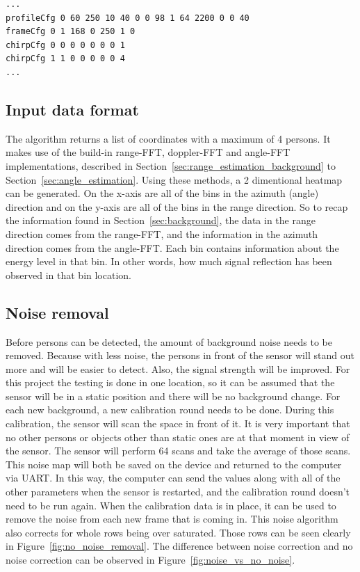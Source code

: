 \begin{lstlisting}[label=lst:parameters, caption=Portion of the parameters file which gets send to the IWR6843 to set it up.]
...
profileCfg 0 60 250 10 40 0 0 98 1 64 2200 0 0 40
frameCfg 0 1 168 0 250 1 0
chirpCfg 0 0 0 0 0 0 0 1
chirpCfg 1 1 0 0 0 0 0 4
...
\end{lstlisting}

\subsection{Input data format}
The algorithm returns a list of coordinates with a maximum of 4 persons. It makes use of the build-in range-FFT, doppler-FFT and angle-FFT implementations, described in Section~\ref{sec:range_estimation_background} to Section~\ref{sec:angle_estimation}. Using these methods, a 2 dimentional heatmap can be generated. On the x-axis are all of the bins in the azimuth (angle) direction and on the y-axis are all of the bins in the range direction. So to recap the information found in Section~\ref{sec:background}, the data in the range direction comes from the range-FFT, and the information in the azimuth direction comes from the angle-FFT. Each bin contains information about the energy level in that bin. In other words, how much signal reflection has been observed in that bin location. 


\subsection{Noise removal}
Before persons can be detected, the amount of background noise needs to be removed. Because with less noise, the persons in front of the sensor will stand out more and will be easier to detect. Also, the signal strength will be improved. For this project the testing is done in one location, so it can be assumed that the sensor will be in a static position and there will be no background change. For each new background, a new calibration round needs to be done. During this calibration, the sensor will scan the space in front of it. It is very important that no other persons or objects other than static ones are at that moment in view of the sensor. The sensor will perform 64 scans and take the average of those scans. This noise map will both be saved on the device and returned to the computer via UART. In this way, the computer can send the values along with all of the other parameters when the sensor is restarted, and the calibration round doesn't need to be run again. When the calibration data is in place, it can be used to remove the noise from each new frame that is coming in. This noise algorithm also corrects for whole rows being over saturated. Those rows can be seen clearly in Figure~\ref{fig:no_noise_removal}. The difference between noise correction and no noise correction can be observed in Figure~\ref{fig:noise_vs_no_noise}.

